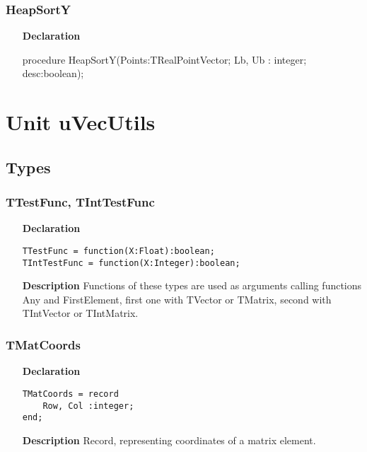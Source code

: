 \documentclass[12pt,a4paper,oneside]{report}
\newcommand{\lmatha}[1]{   %
	\marginpar{\vspace{#1} 
		\begin{flushright}
			LMath 0.5
	\end{flushright} }
}
\newcommand{\declarationitem}[1]{\textbf{#1}}
\newcommand{\descriptiontitle}[1]{\textbf{#1}}
\newcommand{\code}[1]{\texttt{#1}}
\begin{document}
\subsubsection{HeapSortY}
\label{lmsorting-HeapSortY}
\begin{itemize}\item[\declarationitem{Declaration}\hfill]
	\begin{flushleft}
		\begin{ttfamily}
			procedure HeapSortY(Points:TRealPointVector; Lb, Ub : integer; desc:boolean);\end{ttfamily}
		
	\end{flushleft}
\end{itemize}
\section{Unit uVecUtils}\label{sec:unit-uvecutils}
\lmatha{-28pt}
\subsection{Types}
\subsubsection{TTestFunc, TIntTestFunc}
\label{uvecutils:ttestfunc}
\begin{itemize}
	\item[\declarationitem{Declaration}\hfill]
\begin{flushleft}
	\code{TTestFunc = function(X:Float):boolean;}\\
 	\code{TIntTestFunc = function(X:Integer):boolean;}
\end{flushleft}
	\item[\descriptiontitle{Description}]
	Functions of these types are used as arguments calling functions Any and FirstElement, first one with TVector or TMatrix, second with TIntVector or TIntMatrix.
\end{itemize}
\subsubsection{TMatCoords}
\begin{itemize}
	\item[\declarationitem{Declaration}\hfill]
\begin{verbatim}
TMatCoords = record
	Row, Col :integer;
end;
\end{verbatim}
\item[\descriptiontitle{Description}]
Record, representing coordinates of a matrix element.
\end{itemize}
\end{document}
